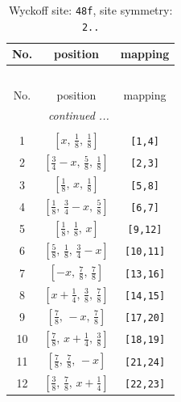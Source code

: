\documentclass[fleqn,8pt]{jsarticle}
\begin{document}
\begin{longtable}{ccc}
\caption{Wyckoff site: {\tt 48f}, site symmetry: {\tt 2..}}
 \\
 \hline \hline
No. & position & mapping \\ \hline \endfirsthead

\multicolumn{2}{l}{\tablename\ \thetable{}} \\
 \hline \hline
No. & position & mapping \\ \hline \endhead

 \hline \hline
\multicolumn{2}{r}{\footnotesize\it continued ...} \\ \endfoot

 \hline \hline
\multicolumn{2}{r}{} \\ \endlastfoot

1 & $\left[ x,\, \frac{1}{8},\, \frac{1}{8} \right]$ & {\tt [1,4]} \\ \hline
2 & $\left[ \frac{3}{4} - x,\, \frac{5}{8},\, \frac{1}{8} \right]$ & {\tt [2,3]} \\ \hline
3 & $\left[ \frac{1}{8},\, x,\, \frac{1}{8} \right]$ & {\tt [5,8]} \\ \hline
4 & $\left[ \frac{1}{8},\, \frac{3}{4} - x,\, \frac{5}{8} \right]$ & {\tt [6,7]} \\ \hline
5 & $\left[ \frac{1}{8},\, \frac{1}{8},\, x \right]$ & {\tt [9,12]} \\ \hline
6 & $\left[ \frac{5}{8},\, \frac{1}{8},\, \frac{3}{4} - x \right]$ & {\tt [10,11]} \\ \hline
7 & $\left[ - x,\, \frac{7}{8},\, \frac{7}{8} \right]$ & {\tt [13,16]} \\ \hline
8 & $\left[ x + \frac{1}{4},\, \frac{3}{8},\, \frac{7}{8} \right]$ & {\tt [14,15]} \\ \hline
9 & $\left[ \frac{7}{8},\, - x,\, \frac{7}{8} \right]$ & {\tt [17,20]} \\ \hline
10 & $\left[ \frac{7}{8},\, x + \frac{1}{4},\, \frac{3}{8} \right]$ & {\tt [18,19]} \\ \hline
11 & $\left[ \frac{7}{8},\, \frac{7}{8},\, - x \right]$ & {\tt [21,24]} \\ \hline
12 & $\left[ \frac{3}{8},\, \frac{7}{8},\, x + \frac{1}{4} \right]$ & {\tt [22,23]} \\
\end{longtable}
\renewcommand{\arraystretch}{1.2}
\end{document}
